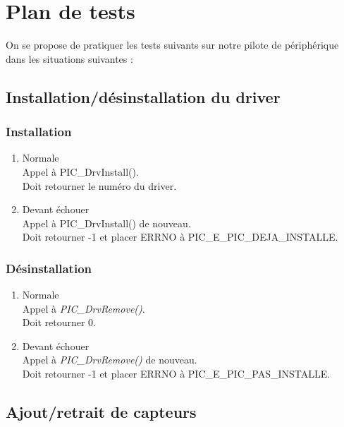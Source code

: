 
\section{Plan de tests}

On se propose de pratiquer les tests suivants sur notre
 pilote de périphérique dans les situations suivantes :

\subsection{Installation/désinstallation du driver}
    \subsubsection{Installation}
        \begin{enumerate}
            \item Normale\\
    Appel à PIC\_DrvInstall().\\
    Doit retourner le numéro du driver.
            \item Devant échouer\\
    Appel à PIC\_DrvInstall() de nouveau.\\
    Doit retourner -1 et placer ERRNO à PIC\_E\_PIC\_DEJA\_INSTALLE.
        \end{enumerate}
    
    \subsubsection{Désinstallation}
        \begin{enumerate}
            \item Normale\\
    Appel à \textsl{PIC\_DrvRemove()}.\\
    Doit retourner 0.
            \item Devant échouer\\
    Appel à \textsl{PIC\_DrvRemove()} de nouveau.\\
    Doit retourner -1 et placer ERRNO à PIC\_E\_PIC\_PAS\_INSTALLE.
        \end{enumerate}

\subsection{Ajout/retrait de capteurs}
